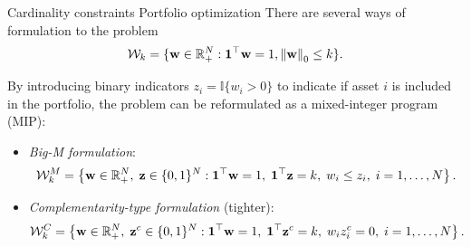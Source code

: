 \documentclass[10pt,aspectratio=169]{beamer}
\newcommand{\Kcard}{k}
\newcommand{\Wset}{\mathcal{W}}
\begin{document}
\begin{frame}{Cardinality constraints Portfolio optimization}
  There are several ways of formulation to the problem
  \[
   \Wset_\Kcard = \{\mathbf{w}\in\RR_+^N : \one^\top \mathbf{w}=1, \norm{\mathbf{w}}_0 \le k\}.
   \]

By introducing binary indicators $z_i = \mathbb{I}\{w_i > 0\}$ to indicate if asset $i$ is included in the portfolio, the problem can be reformulated as a mixed-integer program (MIP):

\begin{itemize}
  \item \emph{Big-M formulation}: 
    \[
      \Wset_\Kcard^M
      =
      \left\{
        \mathbf{w}\in\RR_+^N,\; \mathbf{z}\in\{0,1\}^N :
        \one^\top \mathbf{w}=1,\;
        \one^\top \mathbf{z}=\Kcard,\;
        w_i \le z_i,\; i=1,\ldots,N
      \right\}.
    \] 
  \item \emph{Complementarity-type formulation} (tighter):
    \[
      \Wset_\Kcard^C
      =
      \left\{
        \mathbf{w}\in\RR_+^N,\; \mathbf{z}^c \in\{0,1\}^N :
        \one^\top \mathbf{w}=1,\;
        \one^\top \mathbf{z}^c=\Kcard,\;
        w_i z_i^c = 0,\; i=1,\ldots,N
      \right\}.
    \]
\end{itemize}
\end{frame}
\end{document}
